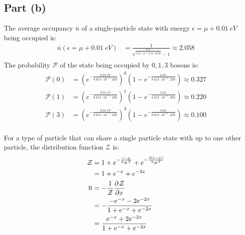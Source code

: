 \documentclass{article}
\begin{document}
\subsection*{Part (b)}
The average occupancy $\overline{n}$ of a single-particle state with energy $\epsilon = \mu + 0.01~\unit{eV}$ being occupied is:
\begin{equation}
    \begin{split}
        \overline{n}\left(\epsilon = \mu + 0.01~\unit{eV}\right) & = \frac{1}{e^{\frac{0.01}{8.617 \cdot 10^{-5}~\unit{eV\per\kelvin} \cdot 293~\unit{\kelvin}}} - 1} \approx 2.058 \\
    \end{split}
\end{equation}
The probability $\mathcal{P}$ of the state being occupied by $0, 1, 3$ bosons is:
\begin{equation}
    \begin{split}
        \mathcal{P}\left(0\right) & = {\left(e^{-\frac{0.01~\unit{eV}}{8.617 \cdot 10^{-5} \cdot 293}}\right)}^0\left(1 - e^{-\frac{0.01}{8.617 \cdot 10^{-5} \cdot 293}}\right) \approx 0.327 \\
        \mathcal{P}\left(1\right) & = {\left(e^{-\frac{0.01~\unit{eV}}{8.617 \cdot 10^{-5} \cdot 293}}\right)}^1\left(1 - e^{-\frac{0.01}{8.617 \cdot 10^{-5} \cdot 293}}\right) \approx 0.220 \\
        \mathcal{P}\left(3\right) & = {\left(e^{-\frac{0.01~\unit{eV}}{8.617 \cdot 10^{-5} \cdot 293}}\right)}^3\left(1 - e^{-\frac{0.01}{8.617 \cdot 10^{-5} \cdot 293}}\right) \approx 0.100 \\
    \end{split}
\end{equation}

\clearpage

For a type of particle that can share a single particle state with up to one other particle, the distribution function $\mathcal{Z}$ is:
\begin{equation}
    \begin{split}
        \mathcal{Z} & = 1 + e^{-\frac{\epsilon - \mu}{k_BT}} + e^{-\frac{2\left(\epsilon - \mu\right)}{k_BT}} \\
        & = 1 + e^{-x} + e^{-2x} \\
        \overline{n} & = -\frac{1}{\mathcal{Z}}\frac{\partial^{}\mathcal{Z}} {\partial  x^{}} \\
        & = -\frac{-e^{-x} - 2e^{-2x}}{1 + e^{-x} + e^{-2x}} \\
        & = \frac{e^{-x} + 2e^{-2x}}{1 + e^{-x} + e^{-2x}} \\
    \end{split}
\end{equation}
\end{document}
